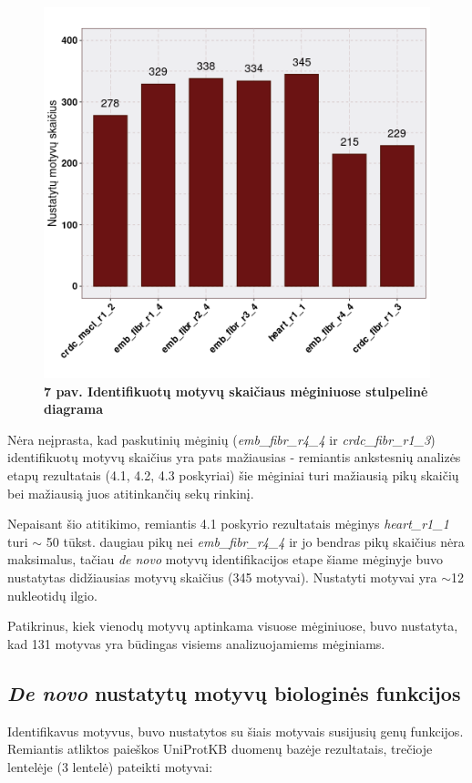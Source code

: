 \documentclass[12pt]{article}
\begin{document}
\begin{figure}[htb]
    \begin{center}
        \includegraphics[width=0.6\linewidth]{../Figures/motifs_in_samples.png}
        \vspace{-2\baselineskip}
        \caption*{\small\textbf{7 pav. Identifikuotų motyvų skaičiaus
                                mėginiuose stulpelinė diagrama}}
    \end{center}
\end{figure}

Nėra neįprasta, kad paskutinių mėginių (\small\emph{emb\_fibr\_r4\_4} ir
\small\emph{crdc\_fibr\_r1\_3}) identifikuotų motyvų skaičius yra pats
mažiausias - remiantis ankstesnių analizės etapų rezultatais (4.1, 4.2, 4.3
poskyriai) šie mėginiai turi mažiausią pikų skaičių bei mažiausią juos
atitinkančių sekų rinkinį.

Nepaisant šio atitikimo, remiantis 4.1 poskyrio rezultatais mėginys
\small\emph{heart\_r1\_1} turi \(\sim\) 50 tūkst. daugiau pikų nei
\small\emph{emb\_fibr\_r4\_4} ir jo bendras pikų skaičius nėra maksimalus,
tačiau \emph{de novo} motyvų identifikacijos etape šiame mėginyje buvo
nustatytas didžiausias motyvų skaičius (345 motyvai). Nustatyti motyvai yra
\(\sim\)12 nukleotidų ilgio.

Patikrinus, kiek vienodų motyvų aptinkama visuose mėginiuose, buvo nustatyta,
kad 131 motyvas yra būdingas visiems analizuojamiems mėginiams.

\newpage

\subsection{\emph{De novo} nustatytų motyvų biologinės funkcijos}
Identifikavus motyvus, buvo nustatytos su šiais motyvais susijusių genų
funkcijos. Remiantis atliktos paieškos UniProtKB\cite{UNIPROTKB} duomenų
bazėje rezultatais, trečioje lentelėje (3 lentelė) pateikti motyvai:
\end{document}
